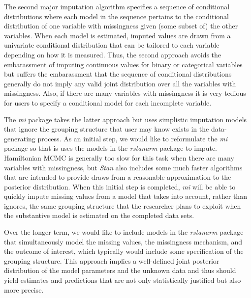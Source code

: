 \documentclass[11pt,notitlepage]{article}
\begin{document}
The second major imputation algorithm specifies a sequence of conditional distributions
where each model in the sequence pertains to the conditional distribution of one variable with
missingness given (some subset of) the other variables. When each model is estimated, imputed
values are drawn from a univariate conditional distribution that can be tailored to each 
variable depending on how it is measured. Thus, the second approach avoids the embarassment
of imputing continuous values for binary or categorical variables but suffers the embarassment
that the sequence of conditional distributions generally do not imply any valid joint 
distribution over all the variables with missingness. Also, if there are many variables with
missingness it is very tedious for users to specify a conditional model for each incomplete
variable.

The \textit{mi} package takes the latter approach but uses simplistic imputation models that 
ignore the grouping structure that user may know exists in the data-generating process. As
an initial step, we would like to reformulate the \textit{mi} package so that is uses the
models in the \textit{rstanarm} package to impute. Hamiltonian MCMC is generally too slow
for this task when there are many variables with missingness, but \textit{Stan} also includes
some much faster algorithms that are intended to provide draws from a reasonable approximation
to the posterior distribution. When this initial step is completed, \textit{mi} will be able
to quickly impute missing values from a model that takes into account, rather than ignores,
the same grouping structure that the researcher plans to exploit when the substantive model
is estimated on the completed data sets.

Over the longer term, we would like to include models in the \textit{rstanarm} package that
simultaneously model the missing values, the missingness mechanism, and the outcome of 
interest, which typically would include some specification of the grouping structure. This
approach implies a well-defined joint posterior distribution of the model parameters and 
the unknown data and thus should yield estimates and predictions that are not only statistically
justified but also more precise.
\end{document}
